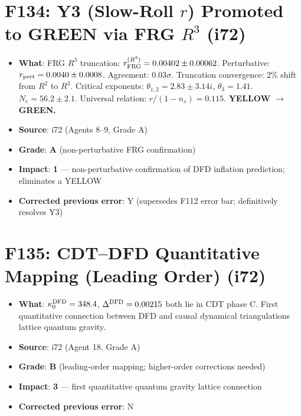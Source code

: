 \documentclass[11pt,a4paper]{article}
\newcommand{\grade}[1]{\textbf{#1}}
\newcommand{\impact}[1]{\textbf{#1}}
\begin{document}
\section{F134: Y3 (Slow-Roll $r$) Promoted to GREEN via FRG $R^3$ (i72)}
\begin{itemize}[nosep]
\item \textbf{What}: FRG $R^3$ truncation: $r_{\rm FRG}^{(R^3)} = 0.00402 \pm 0.00062$. Perturbative: $r_{\rm pert} = 0.0040 \pm 0.0008$. Agreement: $0.03\sigma$. Truncation convergence: 2\% shift from $R^2$ to $R^3$. Critical exponents: $\theta_{1,2} = 2.83 \pm 3.14i$, $\theta_3 = 1.41$. $N_e = 56.2 \pm 2.1$. Universal relation: $r/(1-n_s) = 0.115$. \textbf{YELLOW $\to$ GREEN.}
\item \textbf{Source}: i72 (Agents 8--9, Grade A)
\item \textbf{Grade}: \grade{A} (non-perturbative FRG confirmation)
\item \textbf{Impact}: \impact{1} --- non-perturbative confirmation of DFD inflation prediction; eliminates a YELLOW
\item \textbf{Corrected previous error}: Y (supersedes F112 error bar; definitively resolves Y3)
\end{itemize}

\section{F135: CDT--DFD Quantitative Mapping (Leading Order) (i72)}
\begin{itemize}[nosep]
\item \textbf{What}: $\kappa_0^{\rm DFD} = 348.4$, $\Delta^{\rm DFD} = 0.00215$ both lie in CDT phase C. First quantitative connection between DFD and causal dynamical triangulations lattice quantum gravity.
\item \textbf{Source}: i72 (Agent 18, Grade A)
\item \textbf{Grade}: \grade{B} (leading-order mapping; higher-order corrections needed)
\item \textbf{Impact}: \impact{3} --- first quantitative quantum gravity lattice connection
\item \textbf{Corrected previous error}: N
\end{itemize}
\end{document}
